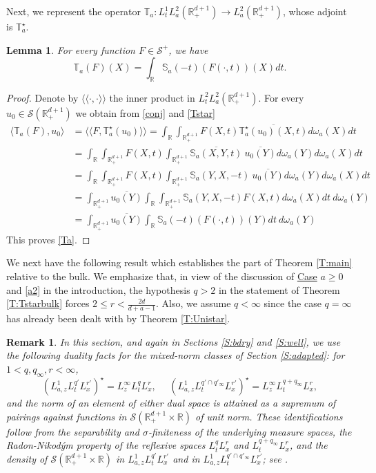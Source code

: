 \documentclass[11pt,letter]{amsart}
\def \RN {\mathbb{R}_+^{d+1}}
\def \R {\mathbb{R}}
\numberwithin{equation}{section}
\newcommand{\sa}{\langle}
\newcommand{\da}{\rangle}
\newcommand{\snn}{\mathscr S^+}
\newtheorem{lemma}[theorem]{Lemma}
\newtheorem{remark}[theorem]{Remark}
\numberwithin{equation}{section}
\begin{document}
Next, we represent the operator $\mathbb T_a: L^1_t L^2_a(\RN)\to L^2_a(\RN)$, whose adjoint is $\mathbb T_a^\star$.

\begin{lemma}\label{L:T}
For every function $F\in \snn$, we have
\begin{equation}\label{Ta}
\mathbb T_a(F)(X) = \int_\R \mathbb S_a(-t)(F(\cdot,t))(X) dt.
\end{equation}
\end{lemma}

\begin{proof}
Denote by $\sa\sa\cdot,\cdot \da\da$ the inner product in $L^2_t L^2_a(\RN)$. For every $u_0\in \mathscr S(\RN)$ we obtain from \eqref{conj} and \eqref{Tstar}  
\begin{align*}
\sa \mathbb T_a(F),u_0\da & = \sa\sa F,\mathbb T_a^\star(u_0)\da\da = \int_\R \int_{\RN} F(X,t) \overline{\mathbb T_a^\star(u_0)(X,t)} d\omega_a(X) dt
\\
& = \int_\R  \int_{\RN} F(X,t) \int_{\RN} \overline{\mathbb S_a(X,Y,t)}\ \overline{u_0(Y)} d\omega_a(Y) d\omega_a(X) dt
\\
& = \int_\R  \int_{\RN} F(X,t) \int_{\RN} \mathbb S_a(Y,X,-t)\ \overline{u_0(Y)} d\omega_a(Y) d\omega_a(X) dt
\\
& = \int_{\RN} \overline{u_0(Y)} \int_\R \int_{\RN} \mathbb S_a(Y,X,-t)F(X,t)d\omega_a(X) dt\ d\omega_a(Y)
\\
& = \int_{\RN} \overline{u_0(Y)} \int_\R \mathbb S_a(-t)(F(\cdot,t))(Y) dt\ d\omega_a(Y)
\end{align*}
This proves \eqref{Ta}.

\end{proof}


We next have the following result which establishes the part of Theorem \ref{T:main} relative to the bulk. We emphasize that, in view of the discussion of \underline{Case} $a\ge 0$ and \eqref{a2} in the introduction, the hypothesis $q>2$ in the statement of  Theorem \ref{T:Tstarbulk} forces $2\le r<\frac{2d}{d+a-1}$. Also, we assume $q<\infty$ since the case $q = \infty$ has already been dealt with by Theorem \ref{T:Unistar}.  

\begin{remark}\label{R:duality}
In this section, and again in Sections \ref{S:bdry} and \ref{S:well}, we use the following duality facts for the mixed-norm classes of Section \ref{S:adapted}: for $1<q, q_\infty, r<\infty$,
\[
\left(L^1_{a,z}L^{q'}_tL^{r'}_x\right)^\star = L^\infty_z L^q_t L^r_x,\ \ \ \ \ \ \left(L^1_{a,z}L^{q'\cap q'_\infty}_tL^{r'}_x\right)^\star = L^\infty_z L^{q+q_\infty}_t L^r_x,
\]
and the norm of an element of either dual space is attained as a supremum of pairings against functions in $\mathscr S(\RN\times\R)$ of unit norm. These identifications follow from the separability and $\sigma$-finiteness of the underlying measure spaces, the Radon-Nikod\'ym property of the reflexive spaces $L^q_tL^r_x$ and $L^{q+q_\infty}_tL^r_x$, and the density of $\mathscr S(\RN\times \R)$ in $L^1_{a,z}L^{q'}_tL^{r'}_x$ and in $L^1_{a,z}L^{q'\cap q'_\infty}_tL^{r'}_x$; see \cite{DU}.
\end{remark}
\end{document}
